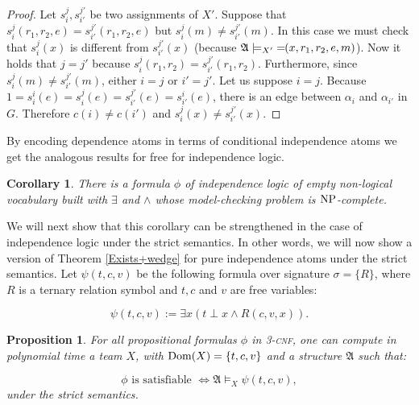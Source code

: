 \documentclass{article}
\theoremstyle{plain}
\newtheorem{corollary}[theorem]{Corollary}
\newtheorem{proposition}[theorem]{Proposition}
\theoremstyle{definition}
\newcommand{\sg}{\sigma}
\newcommand{\mA}{{\mathfrak A}}
\newcommand{\Dom}{{\rm Dom}}
\newcommand*\dep{{=\mkern-1.2mu}}
\newcommand{\np}{{\rm NP}}
\newcommand{\pb}[1]{\textsc{#1}}
\begin{document}
\begin{proof}
	 Let $s_i^j, s_{i'}^{j'}$ be two assignments of $X'$. Suppose that $s_i^j(r_1,r_2,e) = s_{i'}^{j'}(r_1,r_2,e)$ but $s_i^j(m) \neq s_{i'}^{j'}(m)$. In this case we must check that $s_i^j(x)$ is different from $s_{i'}^{j'}(x)$ (because $\mA \models_{X'} \dep(x,r_1,r_2,e,m)$). Now it holds that $j=j'$ because $s_i^j(r_1,r_2) = s_{i'}^{j'}(r_1,r_2)$. Furthermore, since $s_i^j(m) \neq s_{i'}^{j'}(m)$, either $i=j$ or $i'=j'$. Let us suppose $i=j$. Because $1= s^i_i(e)=  s^j_{i}(e) = s^{j'}_{i'}(e)=s^i_{i'}(e)$, there is an edge between $\alpha_i$ and $\alpha_{i'}$ in $G$. Therefore $c(i) \neq c(i')$ and $s^j_i(x) \neq s^{j'}_{i'}(x)$.
	\end{proof}

By encoding dependence atoms in terms of conditional independence atoms we get the analogous results for free for independence logic.
\begin{corollary}
There is a formula $\phi$ of independence logic of empty non-logical vocabulary built with $\exists $ and $\wedge$ whose model-checking problem is  $\np$-complete.
 
\end{corollary}
We will next show that this corollary can be strengthened in the case of independence logic under the strict semantics. In other words, we will now show a  version of Theorem \ref{Exists+wedge}  for pure independence atoms under the strict semantics. Let $\psi(t,c,v)$ be the following formula over signature $\sg=\{R\}$, where $R$ is a ternary relation symbol and  $t,c$ and $v$ are free variables:

\[  \psi(t,c,v) := \exists x (t \perp x \wedge R(c,v,x)).\]

\begin{proposition}\label{StrictInd}
For all propositional formulas $\phi$ in 3-\pb{cnf}, one can compute in polynomial time a  team $X$, with $\Dom(X)=\{t,c,v\}$ and a structure $\mA$ such that:

\[ \phi \mbox{ is satisfiable } \iff  \mA \models_X \psi(t,c,v),\]
under the strict semantics.
\end{proposition}
\end{document}
